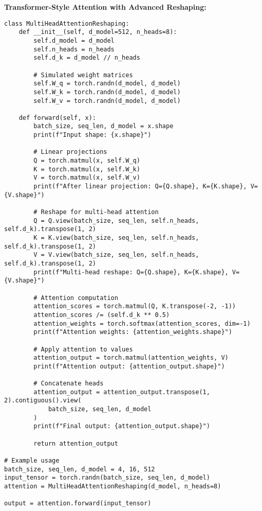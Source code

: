 \documentclass[11pt,a4paper]{book}
\begin{document}
\textbf{Transformer-Style Attention with Advanced Reshaping:}
\begin{verbatim}
class MultiHeadAttentionReshaping:
    def __init__(self, d_model=512, n_heads=8):
        self.d_model = d_model
        self.n_heads = n_heads
        self.d_k = d_model // n_heads
        
        # Simulated weight matrices
        self.W_q = torch.randn(d_model, d_model)
        self.W_k = torch.randn(d_model, d_model)
        self.W_v = torch.randn(d_model, d_model)
    
    def forward(self, x):
        batch_size, seq_len, d_model = x.shape
        print(f"Input shape: {x.shape}")
        
        # Linear projections
        Q = torch.matmul(x, self.W_q)
        K = torch.matmul(x, self.W_k)
        V = torch.matmul(x, self.W_v)
        print(f"After linear projection: Q={Q.shape}, K={K.shape}, V={V.shape}")
        
        # Reshape for multi-head attention
        Q = Q.view(batch_size, seq_len, self.n_heads, self.d_k).transpose(1, 2)
        K = K.view(batch_size, seq_len, self.n_heads, self.d_k).transpose(1, 2)
        V = V.view(batch_size, seq_len, self.n_heads, self.d_k).transpose(1, 2)
        print(f"Multi-head reshape: Q={Q.shape}, K={K.shape}, V={V.shape}")
        
        # Attention computation
        attention_scores = torch.matmul(Q, K.transpose(-2, -1))
        attention_scores /= (self.d_k ** 0.5)
        attention_weights = torch.softmax(attention_scores, dim=-1)
        print(f"Attention weights: {attention_weights.shape}")
        
        # Apply attention to values
        attention_output = torch.matmul(attention_weights, V)
        print(f"Attention output: {attention_output.shape}")
        
        # Concatenate heads
        attention_output = attention_output.transpose(1, 2).contiguous().view(
            batch_size, seq_len, d_model
        )
        print(f"Final output: {attention_output.shape}")
        
        return attention_output

# Example usage
batch_size, seq_len, d_model = 4, 16, 512
input_tensor = torch.randn(batch_size, seq_len, d_model)
attention = MultiHeadAttentionReshaping(d_model, n_heads=8)

output = attention.forward(input_tensor)
\end{verbatim}
\end{document}
